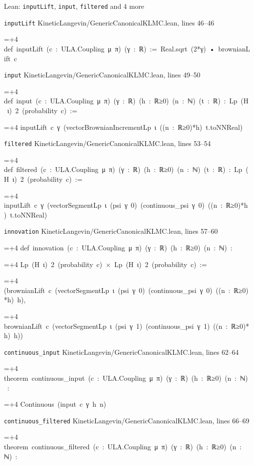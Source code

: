 \documentclass[11pt,a4paper]{article}
\newlength{\leancharwidth}
\newenvironment{leancode}{\par\smallskip\begingroup\ttfamily\footnotesize\raggedright
  \settowidth{\leancharwidth}{M}\setlength{\parskip}{0pt}\setlength{\parindent}{0pt}
  \frenchspacing}{\par\endgroup\smallskip}
\newcommand{\leanline}[2]{\hangindent=\dimexpr#1\leancharwidth+4\leancharwidth\relax
  \hangafter=1\noindent\hspace*{#1\leancharwidth}#2\par}
\newcommand{\leansource}[1]{\par{\footnotesize\color{leanmuted}#1}\par}
\begin{document}
\begin{leanbox}{Lean: \texttt{inputLift}, \texttt{input}, \texttt{filtered} and 4 more}
\leansource{\texttt{inputLift} \quad KineticLangevin/\allowbreak{}GenericCanonicalKLMC.lean, lines 46–46}
\begin{leancode}
\leanline{0}{def\ inputLift\ (c\ :\ ULA.Coupling\ μ\ π)\ (γ\ :\ ℝ)\ :=\ Real.sqrt\ (2*γ)\ •\ brownianLift\ c}
\end{leancode}
\leansource{\texttt{input} \quad KineticLangevin/\allowbreak{}GenericCanonicalKLMC.lean, lines 49–50}
\begin{leancode}
\leanline{0}{def\ input\ (c\ :\ ULA.Coupling\ μ\ π)\ (γ\ :\ ℝ)\ (h\ :\ ℝ≥0)\ (n\ :\ ℕ)\ (t\ :\ ℝ)\ :\ Lp\ (H\ ι)\ 2\ (probability\ c)\ :=}
\leanline{2}{inputLift\ c\ γ\ (vectorBrownianIncrementLp\ ι\ ((n\ :\ ℝ≥0)*h)\ t.toNNReal)}
\end{leancode}
\leansource{\texttt{filtered} \quad KineticLangevin/\allowbreak{}GenericCanonicalKLMC.lean, lines 53–54}
\begin{leancode}
\leanline{0}{def\ filtered\ (c\ :\ ULA.Coupling\ μ\ π)\ (γ\ :\ ℝ)\ (h\ :\ ℝ≥0)\ (n\ :\ ℕ)\ (t\ :\ ℝ)\ :\ Lp\ (H\ ι)\ 2\ (probability\ c)\ :=}
\leanline{2}{inputLift\ c\ γ\ (vectorSegmentLp\ ι\ (psi\ γ\ 0)\ (continuous\_psi\ γ\ 0)\ ((n\ :\ ℝ≥0)*h)\ t.toNNReal)}
\end{leancode}
\leansource{\texttt{innovation} \quad KineticLangevin/\allowbreak{}GenericCanonicalKLMC.lean, lines 57–60}
\begin{leancode}
\leanline{0}{def\ innovation\ (c\ :\ ULA.Coupling\ μ\ π)\ (γ\ :\ ℝ)\ (h\ :\ ℝ≥0)\ (n\ :\ ℕ)\ :}
\leanline{4}{Lp\ (H\ ι)\ 2\ (probability\ c)\ ×\ Lp\ (H\ ι)\ 2\ (probability\ c)\ :=}
\leanline{2}{(brownianLift\ c\ (vectorSegmentLp\ ι\ (psi\ γ\ 0)\ (continuous\_psi\ γ\ 0)\ ((n\ :\ ℝ≥0)*h)\ h),}
\leanline{3}{brownianLift\ c\ (vectorSegmentLp\ ι\ (psi\ γ\ 1)\ (continuous\_psi\ γ\ 1)\ ((n\ :\ ℝ≥0)*h)\ h))}
\end{leancode}
\leansource{\texttt{continuous\_\allowbreak{}input} \quad KineticLangevin/\allowbreak{}GenericCanonicalKLMC.lean, lines 62–64}
\begin{leancode}
\leanline{0}{theorem\ continuous\_input\ (c\ :\ ULA.Coupling\ μ\ π)\ (γ\ :\ ℝ)\ (h\ :\ ℝ≥0)\ (n\ :\ ℕ)\ :}
\leanline{4}{Continuous\ (input\ c\ γ\ h\ n)}
\end{leancode}
\leansource{\texttt{continuous\_\allowbreak{}filtered} \quad KineticLangevin/\allowbreak{}GenericCanonicalKLMC.lean, lines 66–69}
\begin{leancode}
\leanline{0}{theorem\ continuous\_filtered\ (c\ :\ ULA.Coupling\ μ\ π)\ (γ\ :\ ℝ)\ (h\ :\ ℝ≥0)\ (n\ :\ ℕ)\ :}

\end{leancode}
\end{leanbox}
\end{document}
